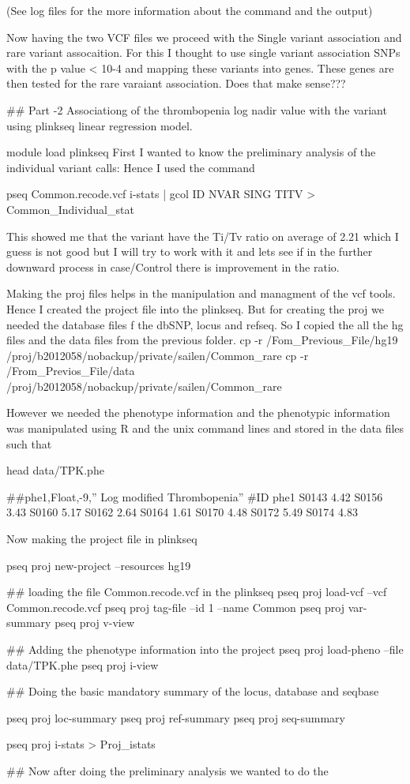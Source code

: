 (See log files for the more information about the command and the output)

Now having the two VCF files we proceed with the Single variant association and rare variant assocaition. For this I thought to use single variant association SNPs with the p value < 10-4 and mapping these variants into genes. These genes are then tested for the rare varaiant association. Does that make sense???

## Part -2 Associationg of the thrombopenia log nadir value with the variant using plinkseq linear regression model.
 
 module load plinkseq
 First I wanted to know the preliminary analysis of the individual variant calls: Hence I used the command
 
 pseq Common.recode.vcf i-stats | gcol ID NVAR SING TITV > Common_Individual_stat
 
 This showed me that the variant have the Ti/Tv ratio on average of 2.21 which I guess is not good but I will try to work with it and lets see if in the further downward process in case/Control there is improvement in the ratio.

Making the proj files helps in the manipulation and managment of the vcf tools. Hence I created the project file into the plinkseq. But for creating the proj we needed the database files f the dbSNP, locus and refseq. So I copied the all the hg files and the data files from the previous folder.
 cp -r /Fom_Previous_File/hg19 /proj/b2012058/nobackup/private/sailen/Common_rare
 cp -r /From_Previos_File/data /proj/b2012058/nobackup/private/sailen/Common_rare
 
 However we needed the phenotype information and the phenotypic information was manipulated using R and the unix command lines  and stored in the data files such that
 
head data/TPK.phe 
 
##phe1,Float,-9,” Log modified Thrombopenia”
#ID	phe1
S0143	4.42
S0156	3.43
S0160	5.17
S0162	2.64
S0164	1.61
S0170	4.48
S0172	5.49
S0174	4.83
 
Now making the project file in plinkseq

pseq proj new-project --resources hg19

## loading the file Common.recode.vcf in the plinkseq
pseq proj load-vcf --vcf Common.recode.vcf 
pseq proj tag-file --id 1 --name Common
pseq proj var-summary
pseq proj v-view

## Adding the phenotype information into the project
pseq proj load-pheno --file data/TPK.phe 
pseq proj i-view

## Doing the basic mandatory summary of the locus, database and seqbase

pseq proj loc-summary
pseq proj ref-summary 
pseq proj seq-summary

 pseq proj i-stats > Proj_istats
 
 ## Now after doing the preliminary analysis we wanted to do the  


 
